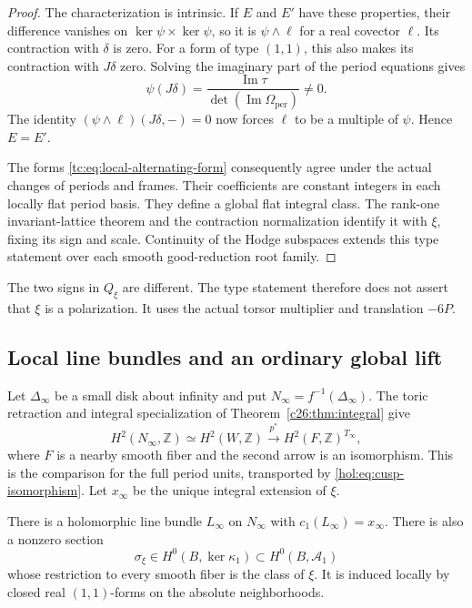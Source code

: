 \begin{proof}
The characterization is intrinsic. If $E$ and $E'$ have these
properties, their difference vanishes on
$\ker\psi\times\ker\psi$, so it is $\psi\wedge\ell$ for a
real covector $\ell$. Its contraction with $\delta$ is zero.
For a form of type $(1,1)$, this also makes its contraction
with $J\delta$ zero. Solving the imaginary part of the period
equations gives
\begin{equation}\label{tc:eq:complex-circle}
 \psi(J\delta)=
 \frac{\operatorname{Im}\tau}
      {\det(\operatorname{Im}\Omega_{\mathrm{per}})}\ne0.
\end{equation}
The identity
$(\psi\wedge\ell)(J\delta,-)=0$ now forces $\ell$ to be a
multiple of $\psi$. Hence $E=E'$.

The forms \eqref{tc:eq:local-alternating-form} consequently
agree under the actual changes of periods and frames.
Their coefficients are constant integers in each locally flat
period basis. They define a global flat integral class.
The rank-one invariant-lattice theorem and the contraction
normalization identify it with $\xi$, fixing its sign and scale.
Continuity of the Hodge subspaces extends this type statement
over each smooth good-reduction root family.
\end{proof}

The two signs in $Q_\xi$ are different. The type statement
therefore does not assert that $\xi$ is a polarization.
It uses the actual torsor multiplier and translation $-6P$.

\subsection{Local line bundles and an ordinary global lift}

Let $\Delta_\infty$ be a small disk about infinity and put
$N_\infty=f^{-1}(\Delta_\infty)$.
The toric retraction and integral specialization of
Theorem~\ref{c26:thm:integral} give
\begin{equation}\label{tc:eq:invariant-extension}
 H^2(N_\infty,\mathbb Z)\simeq H^2(W,\mathbb Z)
      \xrightarrow{\ p^*\ } H^2(F,\mathbb Z)^{T_\infty},
\end{equation}
where $F$ is a nearby smooth fiber and the second arrow is an
isomorphism. This is the comparison for the full period units,
transported by \eqref{hol:eq:cusp-isomorphism}.
Let $x_\infty$ be the unique integral extension of $\xi$.

\begin{proposition}\label{tc:prop:local-line}
There is a holomorphic line bundle $L_\infty$ on $N_\infty$
with $c_1(L_\infty)=x_\infty$.
There is also a nonzero section
\[
 \sigma_\xi\in H^0(B,\ker\kappa_1)
                 \subset H^0(B,\mathcal A_1)
\]
whose restriction to every smooth fiber is the class of $\xi$.
It is induced locally by closed real $(1,1)$-forms on the
absolute neighborhoods.
\end{proposition}

